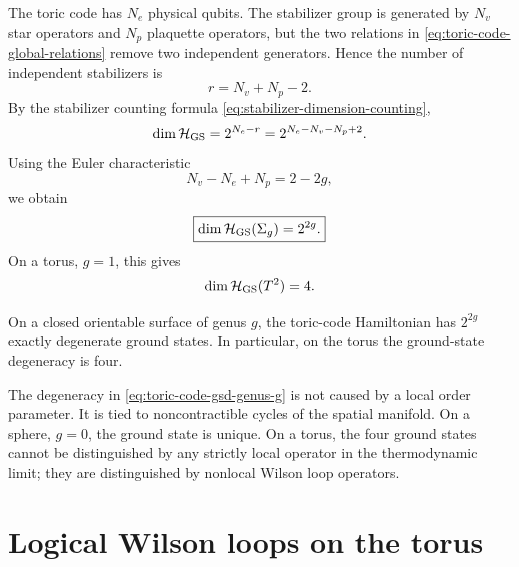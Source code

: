 The toric code has \(N_e\) physical qubits.  The stabilizer group is generated by
\(N_v\) star operators and \(N_p\) plaquette operators, but the two relations in
\cref{eq:toric-code-global-relations} remove two independent generators.  Hence
the number of independent stabilizers is
\begin{equation}
\label{eq:toric-code-independent-stabilizers}
    r=N_v+N_p-2 .
\end{equation}
By the stabilizer counting formula \cref{eq:stabilizer-dimension-counting},
\begin{equation}
\label{eq:toric-code-gsd-counting-first}
    \dim\mathcal{H}_{\rm GS}
    =
    2^{N_e-r}
    =
    2^{N_e-N_v-N_p+2} .
\end{equation}
Using the Euler characteristic
\begin{equation}
\label{eq:euler-characteristic-genus}
    N_v-N_e+N_p=2-2g,
\end{equation}
we obtain
\begin{equation}
\label{eq:toric-code-gsd-genus-g}
    \boxed{
    \dim\mathcal{H}_{\rm GS}(\Sigma_g)=2^{2g} .
    }
\end{equation}
On a torus, \(g=1\), this gives
\begin{equation}
\label{eq:toric-code-gsd-torus}
    \dim\mathcal{H}_{\rm GS}(T^2)=4 .
\end{equation}

\begin{theorem}
On a closed orientable surface of genus \(g\), the toric-code Hamiltonian has
\(2^{2g}\) exactly degenerate ground states.  In particular, on the torus the
ground-state degeneracy is four.
\end{theorem}

\begin{remark}
The degeneracy in \cref{eq:toric-code-gsd-genus-g} is not caused by a local order
parameter.  It is tied to noncontractible cycles of the spatial manifold.  On a
sphere, \(g=0\), the ground state is unique.  On a torus, the four ground states
cannot be distinguished by any strictly local operator in the thermodynamic
limit; they are distinguished by nonlocal Wilson loop operators.
\end{remark}

\section{Logical Wilson loops on the torus}
\label{sec:toric-code-logical-loops}

